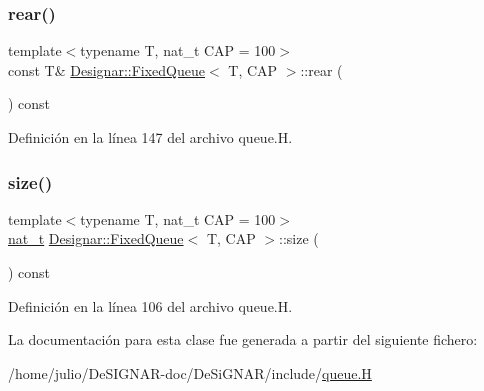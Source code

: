 \subsubsection{\texorpdfstring{rear()}{rear()}\hspace{0.1cm}{\footnotesize\ttfamily [2/2]}}
{\footnotesize\ttfamily template$<$typename T, nat\+\_\+t C\+AP = 100$>$ \\
const T\& \hyperlink{class_designar_1_1_fixed_queue}{Designar\+::\+Fixed\+Queue}$<$ T, C\+AP $>$\+::rear (\begin{DoxyParamCaption}{ }\end{DoxyParamCaption}) const\hspace{0.3cm}{\ttfamily [inline]}}



Definición en la línea 147 del archivo queue.\+H.

\mbox{\label{class_designar_1_1_fixed_queue_a9fa2f855edd54de0c847c8ba35c804cf}} 
\subsubsection{\texorpdfstring{size()}{size()}}
{\footnotesize\ttfamily template$<$typename T, nat\+\_\+t C\+AP = 100$>$ \\
\hyperlink{namespace_designar_aa72662848b9f4815e7bf31a7cf3e33d1}{nat\+\_\+t} \hyperlink{class_designar_1_1_fixed_queue}{Designar\+::\+Fixed\+Queue}$<$ T, C\+AP $>$\+::size (\begin{DoxyParamCaption}{ }\end{DoxyParamCaption}) const\hspace{0.3cm}{\ttfamily [inline]}}



Definición en la línea 106 del archivo queue.\+H.



La documentación para esta clase fue generada a partir del siguiente fichero\+:\begin{DoxyCompactItemize}
\item 
/home/julio/\+De\+S\+I\+G\+N\+A\+R-\/doc/\+De\+Si\+G\+N\+A\+R/include/\hyperlink{queue_8_h}{queue.\+H}\end{DoxyCompactItemize}
